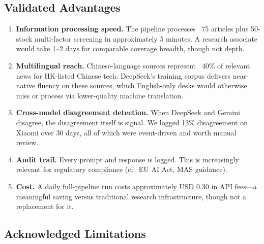 \documentclass[11pt,a4paper]{article}
\begin{document}
\subsection{Validated Advantages}

\begin{enumerate}
\item \textbf{Information processing speed.} The pipeline processes ~75 articles plus 50-stock multi-factor screening in approximately 5 minutes. A research associate would take 1--2 days for comparable coverage breadth, though not depth.
\item \textbf{Multilingual reach.} Chinese-language sources represent ~40\% of relevant news for HK-listed Chinese tech. DeepSeek's training corpus delivers near-native fluency on these sources, which English-only desks would otherwise miss or process via lower-quality machine translation.
\item \textbf{Cross-model disagreement detection.} When DeepSeek and Gemini disagree, the disagreement itself is signal. We logged 13\% disagreement on Xiaomi over 30 days, all of which were event-driven and worth manual review.
\item \textbf{Audit trail.} Every prompt and response is logged. This is increasingly relevant for regulatory compliance (cf.\ EU AI Act, MAS guidance).
\item \textbf{Cost.} A daily full-pipeline run costs approximately USD 0.30 in API fees—a meaningful saving versus traditional research infrastructure, though not a replacement for it.
\end{enumerate}

\subsection{Acknowledged Limitations}
\end{document}
